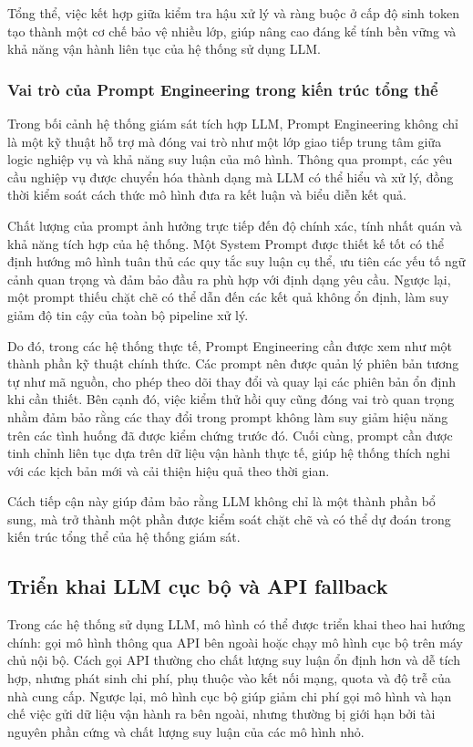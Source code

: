Tổng thể, việc kết hợp giữa kiểm tra hậu xử lý và ràng buộc ở cấp độ sinh token tạo thành một cơ chế bảo vệ nhiều lớp, giúp nâng cao đáng kể tính bền vững và khả năng vận hành liên tục của hệ thống sử dụng LLM.
\subsubsection*{Vai trò của Prompt Engineering trong kiến trúc tổng thể}

Trong bối cảnh hệ thống giám sát tích hợp LLM, Prompt Engineering không chỉ là một kỹ thuật hỗ trợ mà đóng vai trò như một lớp giao tiếp trung tâm giữa logic nghiệp vụ và khả năng suy luận của mô hình. Thông qua prompt, các yêu cầu nghiệp vụ được chuyển hóa thành dạng mà LLM có thể hiểu và xử lý, đồng thời kiểm soát cách thức mô hình đưa ra kết luận và biểu diễn kết quả.

Chất lượng của prompt ảnh hưởng trực tiếp đến độ chính xác, tính nhất quán và khả năng tích hợp của hệ thống. Một System Prompt được thiết kế tốt có thể định hướng mô hình tuân thủ các quy tắc suy luận cụ thể, ưu tiên các yếu tố ngữ cảnh quan trọng và đảm bảo đầu ra phù hợp với định dạng yêu cầu. Ngược lại, một prompt thiếu chặt chẽ có thể dẫn đến các kết quả không ổn định, làm suy giảm độ tin cậy của toàn bộ pipeline xử lý.

Do đó, trong các hệ thống thực tế, Prompt Engineering cần được xem như một thành phần kỹ thuật chính thức. Các prompt nên được quản lý phiên bản tương tự như mã nguồn, cho phép theo dõi thay đổi và quay lại các phiên bản ổn định khi cần thiết. Bên cạnh đó, việc kiểm thử hồi quy cũng đóng vai trò quan trọng nhằm đảm bảo rằng các thay đổi trong prompt không làm suy giảm hiệu năng trên các tình huống đã được kiểm chứng trước đó. Cuối cùng, prompt cần được tinh chỉnh liên tục dựa trên dữ liệu vận hành thực tế, giúp hệ thống thích nghi với các kịch bản mới và cải thiện hiệu quả theo thời gian.

Cách tiếp cận này giúp đảm bảo rằng LLM không chỉ là một thành phần bổ sung, mà trở thành một phần được kiểm soát chặt chẽ và có thể dự đoán trong kiến trúc tổng thể của hệ thống giám sát.
\subsection{Triển khai LLM cục bộ và API fallback}
Trong các hệ thống sử dụng LLM, mô hình có thể được triển khai theo hai hướng chính: gọi mô hình thông qua API bên ngoài hoặc chạy mô hình cục bộ trên máy chủ nội bộ. Cách gọi API thường cho chất lượng suy luận ổn định hơn và dễ tích hợp, nhưng phát sinh chi phí, phụ thuộc vào kết nối mạng, quota và độ trễ của nhà cung cấp. Ngược lại, mô hình cục bộ giúp giảm chi phí gọi mô hình và hạn chế việc gửi dữ liệu vận hành ra bên ngoài, nhưng thường bị giới hạn bởi tài nguyên phần cứng và chất lượng suy luận của các mô hình nhỏ.

